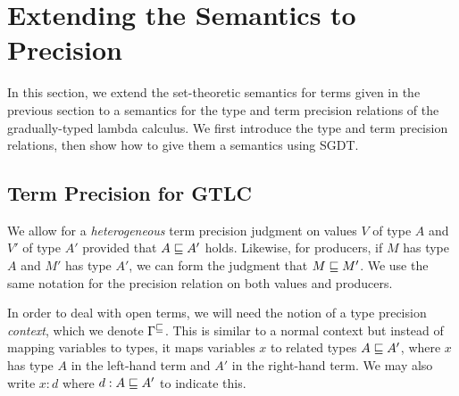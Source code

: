 \section{Extending the Semantics to Precision}\label{sec:gtlc-precision}

In this section, we extend the set-theoretic semantics for terms given in
the previous section to a semantics for the type and term precision relations
of the gradually-typed lambda calculus. We first introduce the type and term precision
relations, then show how to give them a semantics using SGDT.



\subsection{Term Precision for GTLC}



We allow for a \emph{heterogeneous} term precision judgment on values $V$ of type
$A$ and $V'$ of type $A'$ provided that $A \sqsubseteq A'$ holds. Likewise, for producers,
if $M$ has type $A$ and $M'$ has type $A'$, we can form the judgment that $M \sqsubseteq M'$.
We use the same notation for the precision relation on both values and producers.

In order to deal with open terms, we will need the notion of a type precision \emph{context}, which we denote
$\Gamma^\sqsubseteq$. This is similar to a normal context but instead of mapping variables to types,
it maps variables $x$ to related types $A \sqsubseteq A'$, where $x$ has type $A$ in the left-hand term
and $A'$ in the right-hand term. We may also write $x : d$ where $d : A \sqsubseteq A'$ to indicate this.


